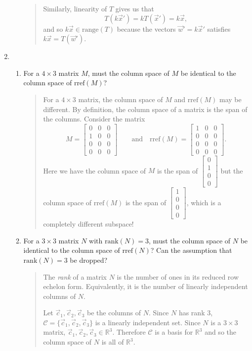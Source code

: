 \documentclass[letter]{article}
\newcommand{\R}{\mathbb{R}}
\newcommand{\Rank}{\mathrm{rank}}
\newcommand{\Rref}{\mathrm{rref}}
\newcommand{\Range}{\mathrm{range}}
\newcommand{\mat}[1]{\begin{bmatrix}#1\end{bmatrix}}
\begin{document}
\begin{enumerate}
\begin{enumerate}
\begin{quote}
					Similarly, linearity of $T$ gives us that
					\[
						T(k\vec x')=kT(\vec x')=k\vec x,
					\]
					and so $k\vec x\in \Range(T)$ because the vectors $\vec w'=k\vec x'$ satisfies
					$k\vec x=T(\vec w')$.

				\end{quote}
		\end{enumerate}
		
		\item 
		\begin{enumerate}
			\item For a $4\times 3$ matrix $M$, must the column space of $M$ be identical to
				the column space of $\mathrm{rref}(M)$?
				\begin{quote}
					For a $4\times 3$ matrix, the column space of $M$ and $\Rref(M)$ may be different.
					By definition, the column space of a matrix is the span of the columns.  Consider the matrix
					\[
						M=\mat{0&0&0\\1&0&0\\0&0&0\\0&0&0}\qquad
						\text{and}
						\quad
						\Rref(M)=\mat{1&0&0\\0&0&0\\0&0&0\\0&0&0}.
					\]
					Here we have the column space of $M$ is the span of $\mat{0\\1\\0\\0}$
					but the column space of $\Rref(M)$ is the span of $\mat{1\\0\\0\\0}$,
					which is a completely different subspace!
				\end{quote}
			\item For a $3\times 3$ matrix $N$ with $\Rank(N)=3$, must the column space of $N$
				be identical to the column space of $\mathrm{rref}(N)$?  Can the assumption
				that $\Rank(N)=3$ be dropped?
				\begin{quote}
					The \emph{rank} of a matrix $N$ is the number of ones in its reduced
					row echelon form.  Equivalently, it is the number of linearly
					independent columns of $N$.

					Let $\vec c_1,\vec c_2,\vec c_3$ be the columns of $N$.  Since
					$N$ has rank 3, $\mathcal C=\{\vec c_1,\vec c_2,\vec c_3\}$ is a linearly independent
					set.  Since $N$ is a $3\times 3$ matrix, $\vec c_1,\vec c_2,\vec c_3\in \R^3$.
					Therefore $\mathcal C$ is a basis for $\R^3$ and so the column space of $N$ is all of
					$\R^3$.


\end{quote}
\end{enumerate}
\end{enumerate}
\end{document}
